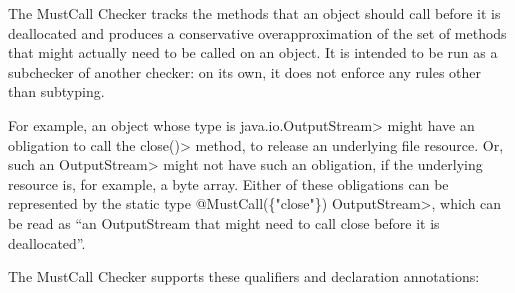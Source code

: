 \htmlhr
{}

The MustCall Checker tracks the methods that an object should call before it is deallocated
and produces a conservative overapproximation of the set of methods that might
actually need to be called on an object.
It is intended to be run as a subchecker of another checker: on its own, it does not
enforce any rules other than subtyping.

For example, an object whose type is \<java.io.OutputStream> might
have an obligation to call the \<close()> method, to release an underlying file resource. Or,
such an \<OutputStream> might not have such an obligation, if the underlying resource is, for
example, a byte array. Either of these obligations can be represented by the static type
\<@MustCall(\{"close"\}) OutputStream>, which can be read as ``an OutputStream that might need
to call close before it is deallocated''.


The MustCall Checker supports these qualifiers and declaration annotations:

